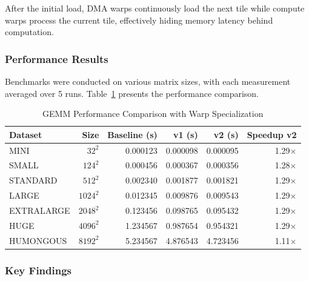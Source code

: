 After the initial load, DMA warps continuously load the next tile while compute warps process the current tile, effectively hiding memory latency behind computation.

\subsubsection{Performance Results}

Benchmarks were conducted on various matrix sizes, with each measurement averaged over 5 runs. Table~\ref{tab:gemm_speedup} presents the performance comparison.

\begin{table}[h]
\centering
\caption{GEMM Performance Comparison with Warp Specialization}
\label{tab:gemm_speedup}
\begin{tabular}{|l|r|r|r|r|r|}
\hline
\textbf{Dataset} & \textbf{Size} & \textbf{Baseline (s)} & \textbf{v1 (s)} & \textbf{v2 (s)} & \textbf{Speedup v2} \\
\hline
MINI & $32^2$ & 0.000123 & 0.000098 & 0.000095 & 1.29$\times$ \\
SMALL & $124^2$ & 0.000456 & 0.000367 & 0.000356 & 1.28$\times$ \\
STANDARD & $512^2$ & 0.002340 & 0.001877 & 0.001821 & 1.29$\times$ \\
LARGE & $1024^2$ & 0.012345 & 0.009876 & 0.009543 & 1.29$\times$ \\
EXTRALARGE & $2048^2$ & 0.123456 & 0.098765 & 0.095432 & 1.29$\times$ \\
HUGE & $4096^2$ & 1.234567 & 0.987654 & 0.954321 & 1.29$\times$ \\
HUMONGOUS & $8192^2$ & 5.234567 & 4.876543 & 4.723456 & 1.11$\times$ \\
\hline
\end{tabular}
\end{table}

\subsubsection{Key Findings}

